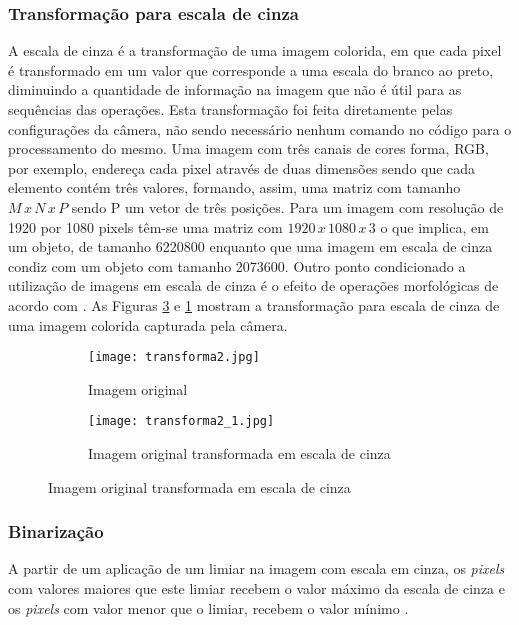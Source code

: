 \subsubsection{Transformação para escala de cinza}
A escala de cinza é a transformação de uma imagem colorida, em que cada pixel é transformado em um valor que corresponde a uma escala do branco ao preto, diminuindo a quantidade de informação na imagem que não é útil para as sequências das operações. Esta transformação foi feita diretamente pelas configurações da câmera, não sendo necessário nenhum comando no código para o processamento do mesmo. Uma imagem com três canais de cores forma, RGB, por exemplo, endereça cada pixel através de duas dimensões sendo que cada elemento contém três valores, formando, assim, uma matriz com tamanho $M\,x\,N\,x\,P$ sendo P um vetor de três posições. Para um imagem com resolução de 1920 por 1080 pixels têm-se uma matriz com $1920\,x\,1080\,x\,3$ o que implica, em um objeto, de tamanho 6220800 enquanto que uma imagem em escala de cinza condiz com um objeto com tamanho 2073600. Outro ponto condicionado a utilização de imagens em escala de cinza é o efeito de operações morfológicas de acordo com \cite{Localisation}. As Figuras \ref{cinza} e \ref{original} mostram a transformação para escala de cinza de uma imagem colorida capturada pela câmera. 

\begin{figure}[H]
    \centering
     \begin{subfigure}{0.8\textwidth}
        \texttt{[image: transforma2.jpg]}
        \caption{Imagem original}
          \label{original}
      \end{subfigure}
        \hfill
      \begin{subfigure}{0.8\textwidth}
        \texttt{[image: transforma2\_1.jpg]}
        \caption{Imagem original transformada em escala de cinza}
          \label{cinza}
      \end{subfigure}
        \hfill
       
\end{figure} 


\subsubsection{Binarização}
A partir de um aplicação de um limiar na imagem com escala em cinza, os \emph{pixels} com valores maiores que este limiar recebem o valor máximo da escala de cinza e os \emph{pixels} com valor menor que o limiar, recebem o valor mínimo  \cite{Gonzalez}.

